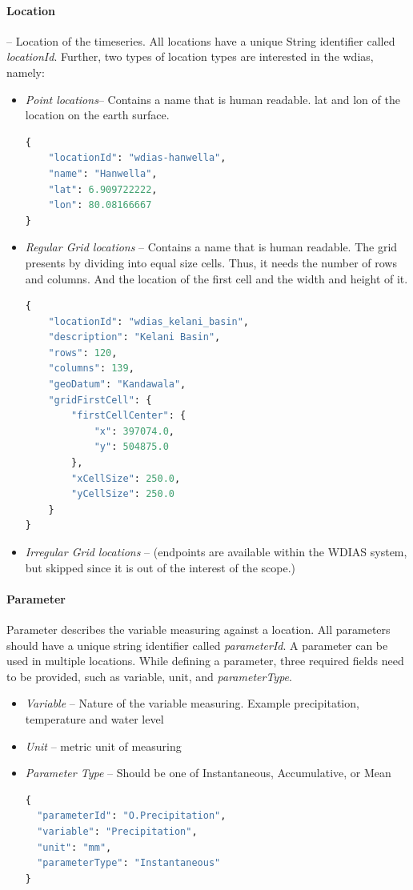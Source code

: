 \paragraph{Location}-- Location of the timeseries. All locations have a unique String identifier called \emph{locationId}. Further, two types of location types are interested in the \acrshort{wdias}, namely:
\begin{itemize}
  \item \emph{Point locations}-- Contains a name that is human readable. lat and lon of the location on the earth surface.
\begin{lstlisting}[language=Python]
{
    "locationId": "wdias-hanwella",
    "name": "Hanwella",
    "lat": 6.909722222,
    "lon": 80.08166667
}
\end{lstlisting}
  \item \emph{Regular Grid locations} -- Contains a name that is human readable. The grid presents by dividing into equal size cells. Thus, it needs the number of rows and columns. 
  And the location of the first cell and the width and height of it.
\begin{lstlisting}[language=Python]
{
    "locationId": "wdias_kelani_basin",
    "description": "Kelani Basin",
    "rows": 120,
    "columns": 139,
    "geoDatum": "Kandawala",
    "gridFirstCell": {
        "firstCellCenter": {
            "x": 397074.0,
            "y": 504875.0
        },
        "xCellSize": 250.0,
        "yCellSize": 250.0
    }
}
\end{lstlisting}
  \item \emph{Irregular Grid locations} -- (endpoints are available within the WDIAS system, but skipped since it is out of the interest of the scope.)
\end{itemize}

\paragraph{Parameter}
Parameter describes the variable measuring against a location. All parameters should have a unique string identifier called \emph{parameterId}. A parameter can be used in multiple locations. While defining a parameter, three required fields need to be provided, such as variable, unit, and \emph{parameterType}.

\begin{itemize}  
  \item \emph{Variable} -- Nature of the variable measuring. Example precipitation, temperature and water level
  \item \emph{Unit} -- metric unit of measuring
  \item \emph{Parameter Type} -- Should be one of Instantaneous, Accumulative, or Mean
\begin{lstlisting}[language=Python]
{
  "parameterId": "O.Precipitation",
  "variable": "Precipitation",
  "unit": "mm",
  "parameterType": "Instantaneous"
}
\end{lstlisting}
\end{itemize}

